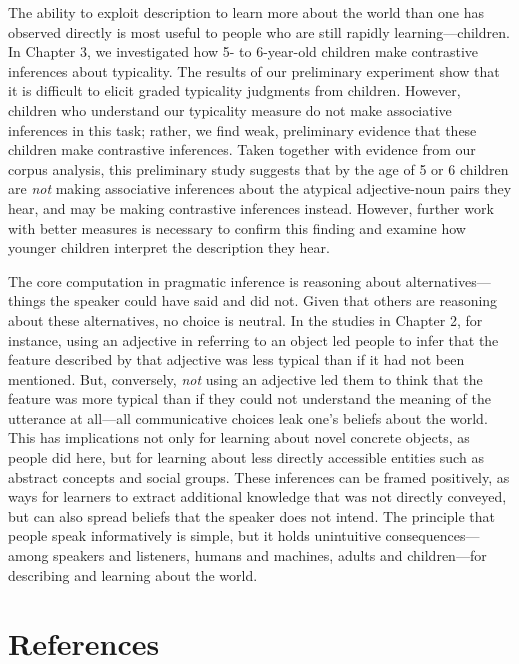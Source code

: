 \documentclass{ucetd}
\begin{document}
The ability to exploit description to learn more about the world than
one has observed directly is most useful to people who are still rapidly
learning---children. In Chapter 3, we investigated how 5- to 6-year-old
children make contrastive inferences about typicality. The results of
our preliminary experiment show that it is difficult to elicit graded
typicality judgments from children. However, children who understand our
typicality measure do not make associative inferences in this task;
rather, we find weak, preliminary evidence that these children make
contrastive inferences. Taken together with evidence from our corpus
analysis, this preliminary study suggests that by the age of 5 or 6
children are \emph{not} making associative inferences about the atypical
adjective-noun pairs they hear, and may be making contrastive inferences
instead. However, further work with better measures is necessary to
confirm this finding and examine how younger children interpret the
description they hear.

The core computation in pragmatic inference is reasoning about
alternatives---things the speaker could have said and did not. Given
that others are reasoning about these alternatives, no choice is
neutral. In the studies in Chapter 2, for instance, using an adjective
in referring to an object led people to infer that the feature described
by that adjective was less typical than if it had not been mentioned.
But, conversely, \emph{not} using an adjective led them to think that
the feature was more typical than if they could not understand the
meaning of the utterance at all---all communicative choices leak one's
beliefs about the world. This has implications not only for learning
about novel concrete objects, as people did here, but for learning about
less directly accessible entities such as abstract concepts and social
groups. These inferences can be framed positively, as ways for learners
to extract additional knowledge that was not directly conveyed, but can
also spread beliefs that the speaker does not intend. The principle that
people speak informatively is simple, but it holds unintuitive
consequences---among speakers and listeners, humans and machines, adults
and children---for describing and learning about the world.

\newpage

\hypertarget{references}{%
\chapter*{References}\label{references}}
\end{document}
